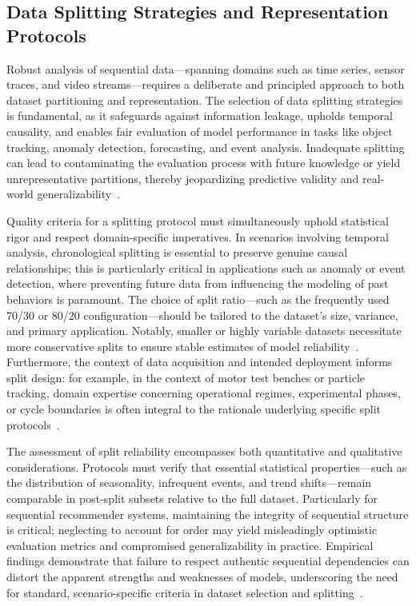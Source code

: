 \subsection{Data Splitting Strategies and Representation Protocols}

Robust analysis of sequential data—spanning domains such as time series, sensor traces, and video streams—requires a deliberate and principled approach to both dataset partitioning and representation. The selection of data splitting strategies is fundamental, as it safeguards against information leakage, upholds temporal causality, and enables fair evaluation of model performance in tasks like object tracking, anomaly detection, forecasting, and event analysis. Inadequate splitting can lead to contaminating the evaluation process with future knowledge or yield unrepresentative partitions, thereby jeopardizing predictive validity and real-world generalizability~\cite{ref87}.

Quality criteria for a splitting protocol must simultaneously uphold statistical rigor and respect domain-specific imperatives. In scenarios involving temporal analysis, chronological splitting is essential to preserve genuine causal relationships; this is particularly critical in applications such as anomaly or event detection, where preventing future data from influencing the modeling of past behaviors is paramount. The choice of split ratio—such as the frequently used 70/30 or 80/20 configuration—should be tailored to the dataset's size, variance, and primary application. Notably, smaller or highly variable datasets necessitate more conservative splits to ensure stable estimates of model reliability~\cite{ref87}. Furthermore, the context of data acquisition and intended deployment informs split design: for example, in the context of motor test benches or particle tracking, domain expertise concerning operational regimes, experimental phases, or cycle boundaries is often integral to the rationale underlying specific split protocols~\cite{ref87}.

The assessment of split reliability encompasses both quantitative and qualitative considerations. Protocols must verify that essential statistical properties—such as the distribution of seasonality, infrequent events, and trend shifts—remain comparable in post-split subsets relative to the full dataset. Particularly for sequential recommender systems, maintaining the integrity of sequential structure is critical; neglecting to account for order may yield misleadingly optimistic evaluation metrics and compromised generalizability in practice. Empirical findings demonstrate that failure to respect authentic sequential dependencies can distort the apparent strengths and weaknesses of models, underscoring the need for standard, scenario-specific criteria in dataset selection and splitting~\cite{ref87}.

